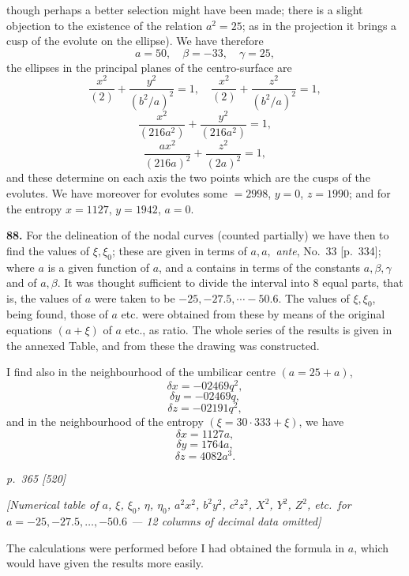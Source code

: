 \documentclass[11pt,a4paper]{article}
\theoremstyle{plain}
\theoremstyle{definition}
\begin{document}
though perhaps a better selection might have been made; there is a slight objection to the existence of the relation $a^2 = 25$; as in the projection it brings a cusp of the evolute on the ellipse). We have therefore
\[
a = 50,\quad \beta = -33,\quad \gamma = 25,
\]
the ellipses in the principal planes of the centro-surface are
\[
\frac{x^2}{(2)} + \frac{y^2}{(b^2/a)^2} = 1, \quad \frac{x^2}{(2)} + \frac{z^2}{(b^2/a)^2} = 1,
\]
\[
\frac{x^2}{(216a^2)} + \frac{y^2}{(216a^2)} = 1,
\]
\[
\frac{a x^2}{(216a)^2} + \frac{z^2}{(2a)^2} = 1,
\]
and these determine on each axis the two points which are the cusps of the evolutes. We have moreover for evolutes some $= 2998$, $y = 0$, $z = 1990$; and for the entropy $x = 1127$, $y = 1942$, $a = 0$.

\textbf{88.} For the delineation of the nodal curves (counted partially) we have then to find the values of $\xi, \xi_0$; these are given in terms of $a, a, $ \textit{ante}, No.\ 33 [p.\ 334]; where $a$ is a given function of $a$, and a contains in terms of the constants $a, \beta, \gamma$ and of $a, \beta$. It was thought sufficient to divide the interval into 8 equal parts, that is, the values of $a$ were taken to be $-25, -27.5, \cdots -50.6$. The values of $\xi, \xi_0$, being found, those of $a$ etc. were obtained from these by means of the original equations $(a + \xi)$ of $a$ etc., as ratio. The whole series of the results is given in the annexed Table, and from these the drawing was constructed.

I find also in the neighbourhood of the umbilicar centre $(a = 25 + a)$,
\[
\delta x = -02469q^2,
\]
\[
\delta y = -02469 q,
\]
\[
\delta z = -02191 q^2,
\]
and in the neighbourhood of the entropy $(\xi = 30 \cdot 333 + \xi)$, we have
\[
\delta x = 1127 a,
\]
\[
\delta y = 1764 a,
\]
\[
\delta z = 4082 a^3.
\]

\clearpage

\bigskip
\textit{p.~365 [520]}
\smallskip


\begin{center}
\textit{[Numerical table of $a$, $\xi$, $\xi_0$, $\eta$, $\eta_0$, $a^2x^2$, $b^2y^2$, $c^2z^2$, $X^2$, $Y^2$, $Z^2$, etc.\ for $a = -25, -27.5, \ldots, -50.6$ --- 12 columns of decimal data omitted]}
\end{center}

The calculations were performed before I had obtained the formula in $a$, which would have given the results more easily.
\end{document}
